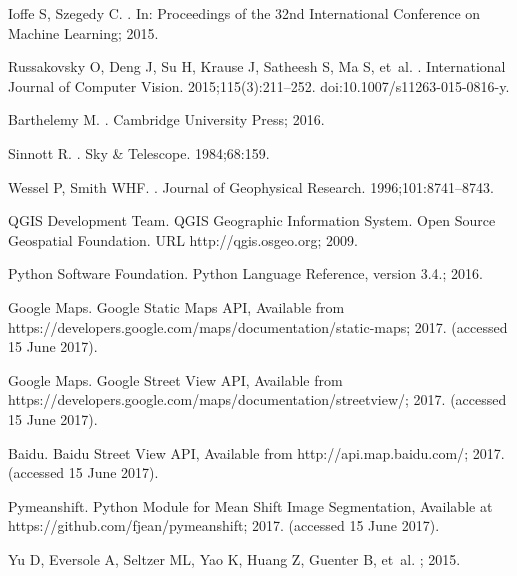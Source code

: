 Ioffe S, Szegedy C.
.
\newblock In: Proceedings of the 32nd International Conference on Machine
  Learning; 2015.

Russakovsky O, Deng J, Su H, Krause J, Satheesh S, Ma S, et~al.
.
\newblock International Journal of Computer Vision. 2015;115(3):211--252.
\newblock doi:{10.1007/s11263-015-0816-y}.

Barthelemy M.
.
\newblock Cambridge University Press; 2016.

Sinnott R.
.
\newblock Sky {\&} Telescope. 1984;68:159.

Wessel P, Smith WHF.
.
\newblock Journal of Geophysical Research. 1996;101:8741--8743.

{QGIS Development Team}. {QGIS Geographic Information System. Open Source
  Geospatial Foundation. URL http://qgis.osgeo.org}; 2009.

{Python Software Foundation}. {Python Language Reference, version 3.4.}; 2016.

{Google Maps}. {Google Static Maps API, Available from
  https://developers.google.com/maps/documentation/static-maps}; 2017.
\newblock (accessed 15 June 2017).

{Google Maps}. {Google Street View API, Available from
  https://developers.google.com/maps/documentation/streetview/}; 2017.
\newblock (accessed 15 June 2017).

Baidu. {Baidu Street View API, Available from http://api.map.baidu.com/}; 2017.
\newblock (accessed 15 June 2017).

Pymeanshift. {Python Module for Mean Shift Image Segmentation, Available at
  https://github.com/fjean/pymeanshift}; 2017.
\newblock (accessed 15 June 2017).

Yu D, Eversole A, Seltzer ML, Yao K, Huang Z, Guenter B, et~al.
; 2015.
  

